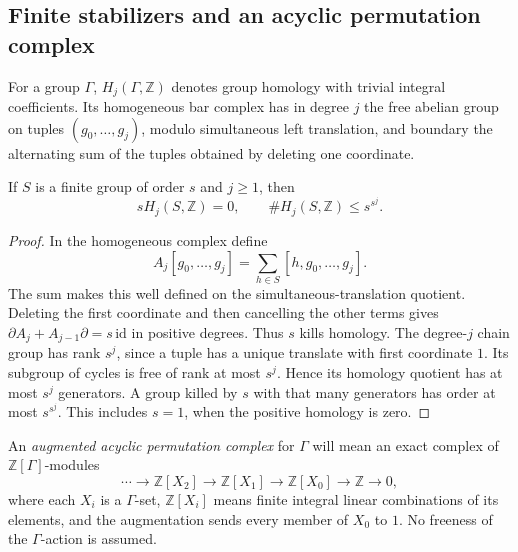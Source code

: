 \subsection{Finite stabilizers and an acyclic permutation complex}

For a group $\Gamma$, $H_j(\Gamma,\mathbb Z)$ denotes group homology
with trivial integral coefficients.  Its homogeneous bar complex
has in degree $j$ the free abelian group on tuples
$(g_0,\ldots,g_j)$, modulo simultaneous left translation, and
boundary the alternating sum of the tuples obtained by deleting
one coordinate.

\begin{lemma}\label{ht-finite-group}
If $S$ is a finite group of order $s$ and $j\ge1$, then
\[
 sH_j(S,\mathbb Z)=0,\qquad
 \#H_j(S,\mathbb Z)\le s^{s^j}.
\]
\end{lemma}
\begin{proof}
In the homogeneous complex define
\[
 A_j[g_0,\ldots,g_j]=\sum_{h\in S}[h,g_0,\ldots,g_j].
\]
The sum makes this well defined on the simultaneous-translation
quotient.  Deleting the first coordinate and then cancelling the
other terms gives
$\partial A_j+A_{j-1}\partial=s\,\mathrm{id}$ in positive
degrees.  Thus $s$ kills homology.  The degree-$j$ chain group
has rank $s^j$, since a tuple has a unique translate with first
coordinate $1$.  Its subgroup of cycles is free of rank at most
$s^j$.  Hence its homology quotient has at most $s^j$ generators.
A group killed by $s$ with that many generators has order at
most $s^{s^j}$.  This includes $s=1$, when the positive homology
is zero.
\end{proof}

An \emph{augmented acyclic permutation complex} for $\Gamma$ will
mean an exact complex of $\mathbb Z[\Gamma]$-modules
\[
 \cdots\longrightarrow \mathbb Z[X_2]\longrightarrow
 \mathbb Z[X_1]\longrightarrow\mathbb Z[X_0]
 \longrightarrow\mathbb Z\longrightarrow0,
\]
where each $X_i$ is a $\Gamma$-set, $\mathbb Z[X_i]$ means finite
integral linear combinations of its elements, and the augmentation
sends every member of $X_0$ to $1$.  No freeness of the
$\Gamma$-action is assumed.

